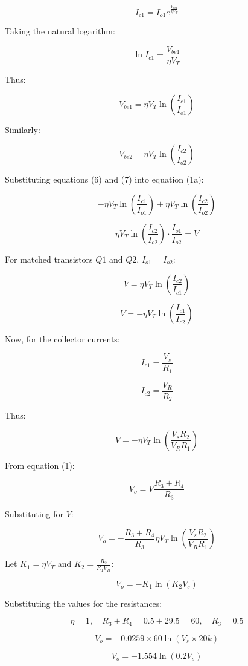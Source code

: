 \documentclass[a4paper,9pt,twoside,openany,twocolumn]{memoir}
\begin{document}
\[
I_{c1} = I_{o1} e^{\frac{V_{be1}}{\eta V_T}} \tag{4}
\]

Taking the natural logarithm:

\[
\ln I_{c1} = \frac{V_{be1}}{\eta V_T} \tag{5}
\]

Thus:

\[
V_{be1} = \eta V_T \ln \left( \frac{I_{c1}}{I_{o1}} \right) \tag{6}
\]

Similarly:

\[
V_{be2} = \eta V_T \ln \left( \frac{I_{c2}}{I_{o2}} \right) \tag{7}
\]

Substituting equations (6) and (7) into equation (1a):

\[
-\eta V_T \ln \left( \frac{I_{c1}}{I_{o1}} \right) + \eta V_T \ln \left( \frac{I_{c2}}{I_{o2}} \right) \tag{8}
\]

\[
\eta V_T \ln \left( \frac{I_{c2}}{I_{o2}} \right) \cdot \frac{I_{o1}}{I_{o2}} = V \tag{9}
\]

For matched transistors \( Q1 \) and \( Q2 \), \( I_{o1} = I_{o2} \):

\[
V = \eta V_T \ln \left( \frac{I_{c2}}{I_{c1}} \right) \tag{10}
\]

\[
V = -\eta V_T \ln \left( \frac{I_{c1}}{I_{c2}} \right) \tag{11}
\]

Now, for the collector currents:

\[
I_{c1} = \frac{V_s}{R_1} \tag{12}
\]

\[
I_{c2} = \frac{V_R}{R_2} \tag{13}
\]

Thus:

\[
V = -\eta V_T \ln \left( \frac{V_s R_2}{V_R R_1} \right) \tag{14}
\]

From equation (1):

\[
V_o = V \frac{R_3 + R_4}{R_3} \tag{15}
\]

Substituting for \( V \):

\[
V_o = -\frac{R_3 + R_4}{R_3} \eta V_T \ln \left( \frac{V_s R_2}{V_R R_1} \right) \tag{16}
\]

Let \( K_1 = \eta V_T \) and \( K_2 = \frac{R_2}{R_1 V_R} \):

\[
V_o = -K_1 \ln \left( K_2 V_s \right) \tag{17}
\]

Substituting the values for the resistances:

\[
\eta = 1, \quad R_3 + R_4 = 0.5 + 29.5 = 60, \quad R_3 = 0.5
\]

\[
V_o = -0.0259 \times 60 \ln \left( V_s \times 20k \right) \tag{18}
\]

\[
V_o = -1.554 \ln \left( 0.2 V_s \right) \tag{19}
\]
\end{document}
